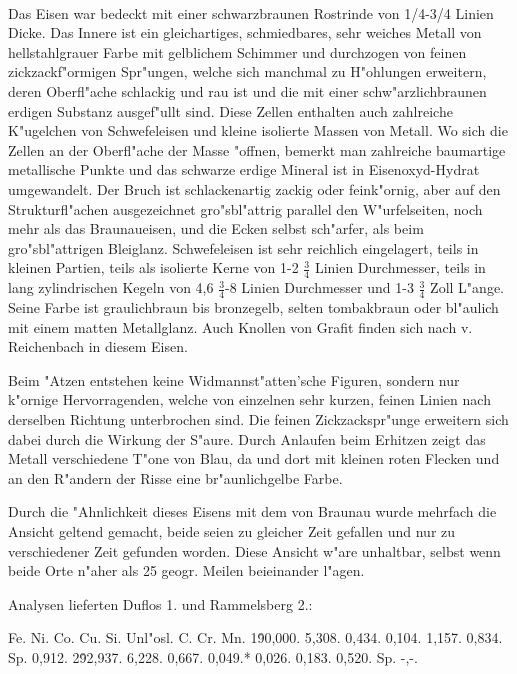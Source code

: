 \documentclass[a4paper, 11pt, oneside]{article}
\begin{document}
\paragraph{}
Das Eisen war bedeckt mit einer schwarzbraunen Rostrinde von 1/4-3/4 Linien Dicke. Das Innere ist ein gleichartiges, schmiedbares, sehr weiches Metall von hellstahlgrauer Farbe mit gelblichem Schimmer und durchzogen von feinen zickzackf"ormigen Spr"ungen, welche sich manchmal zu H"ohlungen erweitern, deren Oberfl"ache schlackig und rau ist und die mit einer schw"arzlichbraunen erdigen Substanz ausgef"ullt sind. Diese Zellen enthalten auch zahlreiche K"ugelchen von Schwefeleisen und kleine isolierte Massen von Metall. Wo sich die Zellen an der Oberfl"ache der Masse "offnen, bemerkt man zahlreiche baumartige metallische Punkte und das schwarze erdige Mineral ist in Eisenoxyd-Hydrat umgewandelt. Der Bruch ist schlackenartig zackig oder feink"ornig, aber auf den Strukturfl"achen ausgezeichnet gro"sbl"attrig parallel den W"urfelseiten, noch mehr als das Braunaueisen, und die Ecken selbst sch"arfer, als beim gro"sbl"attrigen Bleiglanz. Schwefeleisen ist sehr reichlich eingelagert, teils in kleinen Partien, teils als isolierte Kerne von 1-2 $\frac{3}{4}$ Linien Durchmesser, teils in lang zylindrischen Kegeln von 4,6 $\frac{3}{4}$-8 Linien Durchmesser und 1-3 $\frac{3}{4}$ Zoll L"ange. Seine Farbe ist graulichbraun bis bronzegelb, selten tombakbraun oder bl"aulich mit einem matten Metallglanz. Auch Knollen von Grafit finden sich nach v. Reichenbach in diesem Eisen.

Beim "Atzen entstehen keine Widmannst"atten'sche Figuren, sondern nur k"ornige Hervorragenden, welche von einzelnen sehr kurzen, feinen Linien nach derselben Richtung unterbrochen sind. Die feinen Zickzackspr"unge erweitern sich dabei durch die Wirkung der S"aure. Durch Anlaufen beim Erhitzen zeigt das Metall verschiedene T"one von Blau, da und dort mit kleinen roten Flecken und an den R"andern der Risse eine br"aunlichgelbe Farbe.

Durch die "Ahnlichkeit dieses Eisens mit dem von Braunau wurde mehrfach die Ansicht geltend gemacht, beide seien zu gleicher Zeit gefallen und nur zu verschiedener Zeit gefunden worden. Diese Ansicht w"are unhaltbar, selbst wenn beide Orte n"aher als 25 geogr. Meilen beieinander l"agen.

Analysen lieferten Duflos 1. und Rammelsberg 2.:

Fe. Ni. Co. Cu. Si. Unl"osl. C. Cr. Mn.  
1\. 90,000. 5,308. 0,434. 0,104. 1,157. 0,834. Sp. 0,912.  
2\. 92,937. 6,228. 0,667. 0,049.* 0,026. 0,183. 0,520. Sp. -,-.
\end{document}
